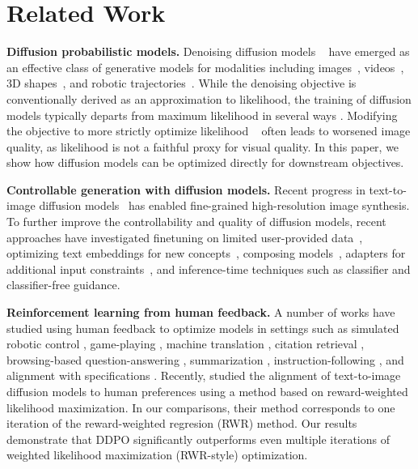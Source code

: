\section{Related Work}
\label{sec:related}

\textbf{Diffusion probabilistic models.}
Denoising diffusion models ~\citep{sohldickstein2015nonequilibrium,ho2020denoising} have emerged as an effective class of generative models for modalities including images~\citep{ramesh2021dalle,saharia2022imagen}, videos~\citep{ho2022imagenvideo,singer2022make}, 3D shapes~\citep{zhou20213d, zeng2022lion}, and robotic trajectories~\citep{janner2022diffuser,ajay2022conditional,chi2023diffusion}.
While the denoising objective is conventionally derived as an approximation to likelihood, the training of diffusion models typically departs from maximum likelihood in several ways \citep{ho2020denoising}.
Modifying the objective to more strictly optimize likelihood ~\citep{nichol2021improved, kingma2021vdms} often leads to worsened image quality, as likelihood is not a faithful proxy for visual quality.
In this paper, we show how diffusion models can be optimized directly for downstream objectives.

\textbf{Controllable generation with diffusion models.}
Recent progress in text-to-image diffusion models~\citep{ramesh2021dalle,saharia2022imagen} has enabled fine-grained high-resolution image synthesis.
To further improve the controllability and quality of diffusion models, recent approaches have investigated finetuning on limited user-provided data~\citep{ruiz2022dreambooth},
optimizing text embeddings for new concepts~\citep{gal2022image},
composing models~\citep{du2023reduce,liu2022compositional},
adapters for additional input constraints~\citep{zhang2023adding},
and inference-time techniques such as classifier \citep{dhariwal2021diffusion} and classifier-free \citep{ho2021classifierfree} guidance.

\textbf{Reinforcement learning from human feedback.}
A number of works have studied using human feedback to optimize models in settings such as simulated robotic control \citep{christiano2017rlhf},
game-playing \citep{knox2008tamer},
machine translation \citep{nguyen2017reinforcement},
citation retrieval \citep{menick2022teaching},
browsing-based question-answering \citep{nakano2021webgpt},
summarization \citep{stiennon2020feedback,ziegler2019rlhf},
instruction-following \citep{ouyang2022instructgpt},
and alignment with specifications \citep{bai2022hhh}.
Recently, \citet{lee2023aligning} studied the alignment of text-to-image diffusion models to human preferences using a method based on reward-weighted likelihood maximization.
In our comparisons, their method corresponds to one iteration of the reward-weighted regresion (RWR) method.
Our results demonstrate that DDPO significantly outperforms even multiple iterations of weighted likelihood maximization (RWR-style) optimization.

